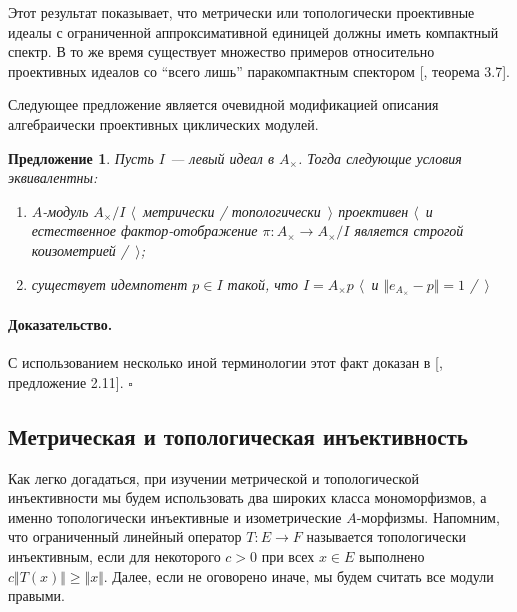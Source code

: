 \documentclass[12pt]{article}
\newtheorem{proposition}[theorem]{Предложение}
\renewenvironment{proof}{\paragraph{Доказательство.}}{\hfill$\square$\medskip}
\begin{document}
Этот результат показывает, что метрически или топологически проективные идеалы с
ограниченной аппроксимативной единицей должны иметь компактный спектр. В то же
время существует множество примеров относительно проективных идеалов со ``всего
лишь'' паракомпактным спектором [\cite{HelHomolBanTopAlg}, теорема 3.7].

Следующее предложение является очевидной модификацией описания алгебраически
проективных циклических модулей.

\begin{proposition}\label{MetTopProjCycModCharac} Пусть $I$ --- левый идеал в
    $A_\times $. Тогда следующие условия эквивалентны:
    \begin{enumerate}[label = (\roman*)]

        \item $A$-модуль $A_\times /I$ $\langle$~метрически /
              топологически~$\rangle$ проективен $\langle$~и естественное
              фактор-отображение $\pi:A_\times \to A_\times /I$ является строгой
              коизометрией /~$\rangle$;

        \item существует идемпотент $p\in I$ такой, что $I=A_\times  p$ $\langle$~и
              $\Vert e_{A_\times }-p\Vert= 1$ /~$\rangle$
    \end{enumerate}
\end{proposition}
\begin{proof} С использованием несколько иной терминологии этот факт доказан в
    [\cite{WhiteInjmoduAlg}, предложение 2.11].
\end{proof}


\subsection{Метрическая и топологическая
    инъективность}\label{SubSectionMetricAndTopologicalInjectivity}

Как легко догадаться, при изучении метрической и топологической инъективности мы
будем использовать два широких класса мономорфизмов, а именно топологически
инъективные и изометрические $A$-морфизмы. Напомним, что ограниченный линейный
оператор $T:E\to F$ называется топологически инъективным, если для некоторого
$c>0$ при всех $x\in E$ выполнено $c\Vert T(x)\Vert\geq \Vert x\Vert$. Далее,
если не оговорено иначе, мы будем считать все модули правыми.
\end{document}
